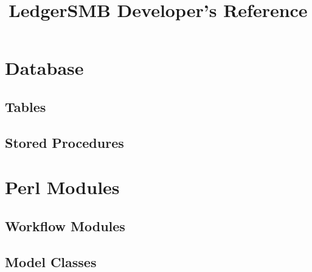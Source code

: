 \documentclass[usletter twoside]{book}
\title{LedgerSMB Developer's Reference}
\begin{document}
\maketitle
\part{Database}
\chapter{Tables}

\chapter{Stored Procedures}

\part{Perl Modules}
\chapter{Workflow Modules}

\chapter{Model Classes}

\end{document}
